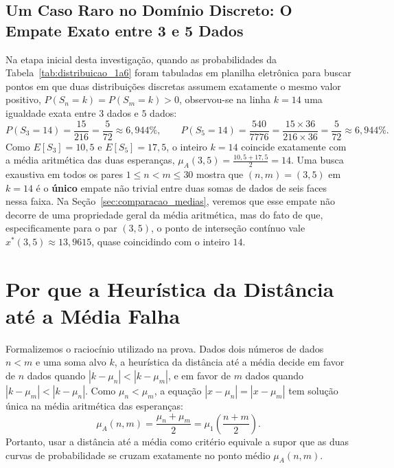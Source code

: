 \documentclass[11pt,a4paper]{article}
\theoremstyle{definition}
\theoremstyle{remark}
\begin{document}
\subsection{Um Caso Raro no Domínio Discreto: O Empate Exato entre 3 e 5 Dados}

Na etapa inicial desta investigação, quando as probabilidades da Tabela~\ref{tab:distribuicao_1a6} foram tabuladas em planilha eletrônica para buscar pontos em que duas distribuições discretas assumem exatamente o mesmo valor positivo, $P(S_n = k) = P(S_m = k) > 0$, observou-se na linha $k = 14$ uma igualdade exata entre $3$ dados e $5$ dados:
\[
P(S_3 = 14) = \frac{15}{216} = \frac{5}{72} \approx 6{,}944\%,
\qquad
P(S_5 = 14) = \frac{540}{7776} = \frac{15 \times 36}{216 \times 36} = \frac{5}{72} \approx 6{,}944\%.
\]
Como $E[S_3] = 10{,}5$ e $E[S_5] = 17{,}5$, o inteiro $k = 14$ coincide exatamente com a média aritmética das duas esperanças, $\mu_A(3,5) = \frac{10{,}5 + 17{,}5}{2} = 14$. Uma busca exaustiva em todos os pares $1 \le n < m \le 30$ mostra que $(n, m) = (3, 5)$ em $k = 14$ é o \textbf{único} empate não trivial entre duas somas de dados de seis faces nessa faixa. Na Seção~\ref{sec:comparacao_medias}, veremos que esse empate não decorre de uma propriedade geral da média aritmética, mas do fato de que, especificamente para o par $(3,5)$, o ponto de interseção contínuo vale $x^*(3,5) \approx 13{,}9615$, quase coincidindo com o inteiro $14$.

\section{Por que a Heurística da Distância até a Média Falha}
\label{sec:falacia}

Formalizemos o raciocínio utilizado na prova. Dados dois números de dados $n < m$ e uma soma alvo $k$, a heurística da distância até a média decide em favor de $n$ dados quando $|k - \mu_n| < |k - \mu_m|$, e em favor de $m$ dados quando $|k - \mu_m| < |k - \mu_n|$. Como $\mu_n < \mu_m$, a equação $|x - \mu_n| = |x - \mu_m|$ tem solução única na média aritmética das esperanças:
\begin{equation}
\mu_A(n, m) = \frac{\mu_n + \mu_m}{2} = \mu_1 \left(\frac{n + m}{2}\right).
\label{eq:media_aritmetica}
\end{equation}
Portanto, usar a distância até a média como critério equivale a supor que as duas curvas de probabilidade se cruzam exatamente no ponto médio $\mu_A(n,m)$.
\end{document}
